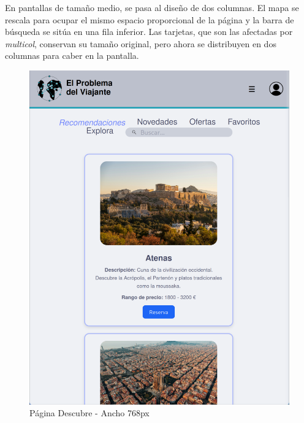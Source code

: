 \documentclass[11pt, a4paper]{book}
\begin{document}
    En pantallas de tamaño medio, se pasa al diseño de dos columnas. El mapa se rescala para ocupar el mismo espacio proporcional de la página y la barra de búsqueda se sitúa en una fila inferior. Las tarjetas, que son las afectadas por \textit{multicol}, conservan su tamaño original, pero ahora se distribuyen en dos columnas para caber en la pantalla.
	
	\begin{figure} [H]
		\centering
		\includegraphics[height=0.4\textheight]{CSS/4-5 768.png}
		\caption{Página Descubre - Ancho 768px}
	\end{figure}
\end{document}
